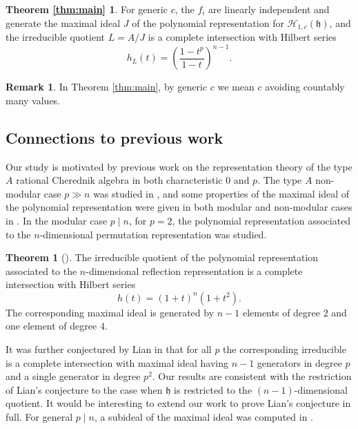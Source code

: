 \documentclass{amsart}
\numberwithin{equation}{section}
\theoremstyle{definition}
\newtheorem{theorem}{Theorem}[section]
\newtheorem*{remark}{Remark}
\newcommand{\h}{\mathfrak{h}}
\newcommand{\HH}{\mathcal{H}}
\begin{document}
\newtheorem*{thm:main}{Theorem \ref{thm:main}} \begin{thm:main}
For generic $c$, the $f_i$ are linearly independent and generate the maximal ideal $J$ of the polynomial representation for $\HH_{1, c}(\h)$, and the irreducible quotient $L = A/J$ is a complete intersection with Hilbert series 
\[
h_L(t) = \left(\frac{1-t^p}{1-t}\right)^{n-1}.
\]
\end{thm:main}
\begin{remark}
In Theorem \ref{thm:main}, by generic $c$ we mean $c$ avoiding countably many values.
\end{remark}

\subsection{Connections to previous work}

Our study is motivated by previous work on the representation theory of the type $A$ rational Cherednik algebra in both characteristic $0$ and $p$.  The type $A$ non-modular case $p \gg n$ was studied in \cite{BFG}, and some properties of the maximal ideal of the polynomial representation were given in both modular and non-modular cases in \cite{BC1}.  In the modular case $p \mid n$, for $p = 2$, the polynomial representation associated to the $n$-dimensional permutation representation was studied.
\begin{theorem}[{\cite[Theorem 5.1]{L}}] \label{thm:lian}
The irreducible quotient of the polynomial representation associated to the $n$-dimensional reflection representation is a complete intersection with Hilbert series
\[
h(t) = (1 + t)^n (1 + t^2).
\]
The corresponding maximal ideal is generated by $n - 1$ elements of degree $2$ and one element of degree $4$. 
\end{theorem} 
It was further conjectured by Lian in \cite[Conjecture 5.2]{L} that for all $p$ the corresponding irreducible is a complete intersection with maximal ideal having $n - 1$ generators in degree $p$ and a single generator in degree $p^2$.  Our results are consistent with the restriction of Lian's conjecture to the case when $\h$ is restricted to the $(n - 1)$-dimensional quotient.  It would be interesting to extend our work to prove Lian's conjecture in full.  For general $p \mid n$, a subideal of the maximal ideal was computed in \cite[Proposition 6.1]{DS}.
\end{document}
